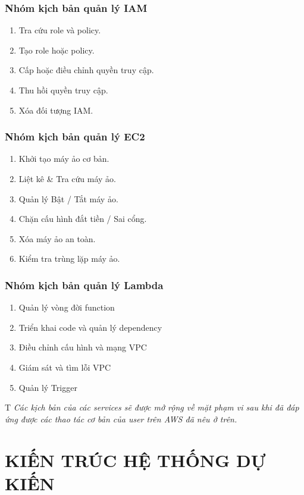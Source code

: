 \documentclass[a4paper,12pt]{article}
\begin{document}
\subsubsection{Nhóm kịch bản quản lý IAM}
\begin{enumerate}
  \item Tra cứu role và policy.
  \item Tạo role hoặc policy.
  \item Cấp hoặc điều chỉnh quyền truy cập.
  \item Thu hồi quyền truy cập.
  \item Xóa đối tượng IAM.
\end{enumerate}

\subsubsection{Nhóm kịch bản quản lý EC2}
\begin{enumerate}
  \item Khởi tạo máy ảo cơ bản.
  \item Liệt kê \& Tra cứu máy ảo.
  \item Quản lý Bật / Tắt máy ảo.
  \item Chặn cấu hình đắt tiền / Sai cổng.
  \item Xóa máy ảo an toàn.
  \item Kiểm tra trùng lặp máy ảo.
\end{enumerate}
\subsubsection{Nhóm kịch bản quản lý Lambda}
\begin{enumerate}
  \item Quản lý vòng đời function
  \item Triển khai code và quản lý dependency
  \item Điều chỉnh cấu hình và mạng VPC
  \item Giám sát và tìm lỗi VPC
  \item Quản lý Trigger
\end{enumerate}T
\textit{Các kịch bản của các services sẽ được mở rộng về mặt phạm vi sau khi đã đáp ứng được các thao tác cơ bản của user trên AWS đã nêu ở trên.}


\section{KIẾN TRÚC HỆ THỐNG DỰ KIẾN}
\end{document}
